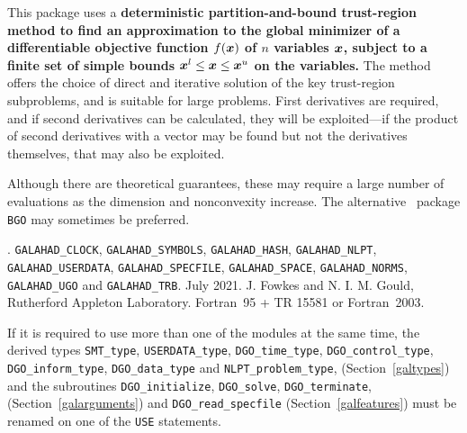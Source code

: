\documentclass{galahad}
\newcommand{\packagename}{DGO}
\newcommand{\fullpackagename}{\libraryname\_\packagename}
\begin{document}
\galheader


\galsummary
This package uses a {\bf deterministic partition-and-bound trust-region 
method to find an approximation to the global minimizer of a differentiable 
objective function $f({\bm{x}})$ of $n$ variables ${\bm{x}}$, subject to a
finite set of simple bounds ${\bm{x}}^l \leq {\bm{x}} \leq {\bm{x}}^u$ on the variables.}
The method offers the choice of direct
and iterative solution of the key trust-region subproblems, and
is suitable for large problems. First derivatives are required,
and if second derivatives can be calculated, they will be exploited---if
the product of second derivatives with a vector may be found but
not the derivatives themselves, that may also be exploited.

Although there are theoretical guarantees, these may require a large
number of evaluations as the dimension and nonconvexity increase.
The alternative \libraryname\ package {\tt BGO} may sometimes be
preferred.


\galattributes
\galversions{\tt  \fullpackagename\_single, \fullpackagename\_double}.
\galuses
{\tt GALAHAD\_CLOCK},
{\tt GALAHAD\_SY\-M\-BOLS},
{\tt GALAHAD\_HASH},
{\tt GALAHAD\_NLPT},
{\tt GALAHAD\_USERDATA},
{\tt GALAHAD\_SPECFILE},
{\tt GALAHAD\_SPACE},
{\tt GALAHAD\_\-NORMS},
{\tt GALAHAD\_UGO}
and 
{\tt GALAHAD\_TRB}.
\galdate July 2021.
\galorigin J. Fowkes and N. I. M. Gould, Rutherford Appleton Laboratory.
\gallanguage Fortran~95 + TR 15581 or Fortran~2003.


\galhowto




\noindent
If it is required to use more than one of the modules at the same time, 
the derived types
{\tt SMT\_type},
{\tt USERDATA\_type},
{\tt \packagename\_time\_\-type},
{\tt \packagename\_control\_type},
{\tt \packagename\_inform\_type},
{\tt \packagename\_data\_type}
and
{\tt NLPT\_problem\_type},
(Section~\ref{galtypes})
and the subroutines
{\tt \packagename\_initialize},
{\tt \packagename\_\-solve},
{\tt \packagename\_terminate},
(Section~\ref{galarguments})
and
{\tt \packagename\_read\_specfile}
(Section~\ref{galfeatures})
must be renamed on one of the {\tt USE} statements.
\end{document}
